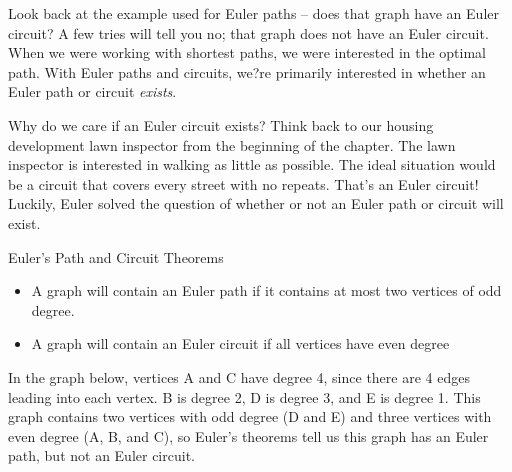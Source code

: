 Look back at the example used for Euler paths -- does that graph have an Euler circuit?  A few tries will tell you no; that graph does not have an Euler circuit.  When we were working with shortest paths, we were interested in the optimal path.  With Euler paths and circuits, we?re primarily interested in whether an Euler path or circuit \textit{exists}.  

Why do we care if an Euler circuit exists?  Think back to our housing development lawn inspector from the beginning of the chapter.  The lawn inspector is interested in walking as little as possible.  The ideal situation would be a circuit that covers every street with no repeats.  That's an Euler circuit!  Luckily, Euler solved the question of whether or not an Euler path or circuit will exist.

\begin{theorem}{Euler's Path and Circuit Theorems}
\hspace{3in}
\begin{itemize}
\item A graph will contain an Euler path if it contains at most two vertices of odd degree.
\item A graph will contain an Euler circuit if all vertices have even degree
\end{itemize}
\end{theorem}

\begin{example}{}%
In the graph below, vertices A and C have degree 4, since there are 4 edges leading into each vertex.  B is degree 2, D is degree 3, and E is degree 1.  This graph contains two vertices with odd degree (D and E) and three vertices with even degree (A, B, and C), so Euler's theorems tell us this graph has an Euler path, but not an Euler circuit.\\
\end{example}

